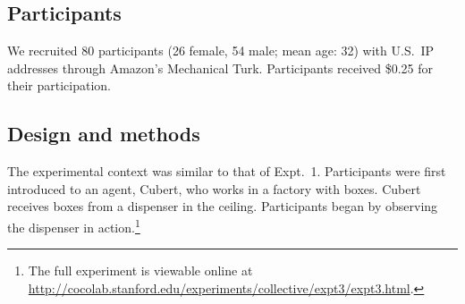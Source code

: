 \documentclass[preprint,12pt,authoryear,titlepage]{elsarticle}
\begin{document}
%
%
%


\subsection{Participants}

We recruited 80 participants (26 female, 54 male; mean age: 32) with U.S.~IP addresses through Amazon's Mechanical Turk. Participants received \$0.25 for their participation.

\subsection{Design and methods}

The experimental context was similar to that of Expt.~1. Participants were first introduced to an agent, Cubert, who works in a factory with boxes. Cubert receives boxes from a dispenser in the ceiling. Participants began by observing the dispenser in action.\footnote{The full experiment is viewable online at \url{http://cocolab.stanford.edu/experiments/collective/expt3/expt3.html}.} 
\end{document}
